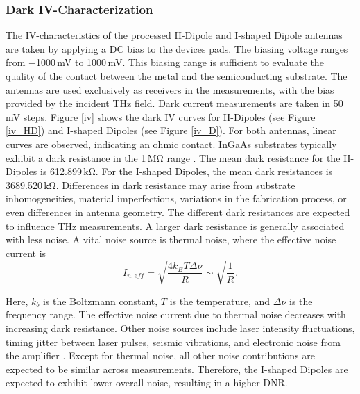 \subsubsection{Dark IV-Characterization}

The IV-characteristics of the processed H-Dipole and I-shaped Dipole antennas are taken by applying a DC bias to the devices pads. The biasing voltage ranges from \num{-1000}\,\si{\milli \volt} to \num{1000}\,\si{\milli \volt}. This biasing range is sufficient to evaluate the quality of the contact between the metal and the semiconducting substrate. The antennas are used exclusively as receivers in the measurements, with the bias provided by the incident THz field. Dark current measurements are taken in \num{50}\,\si{\milli \volt} steps. Figure \ref{iv} shows the dark IV curves for H-Dipoles (see Figure \ref{iv_HD}) and I-shaped Dipoles (see Figure \ref{iv_D}). For both antennas, linear curves are observed, indicating an ohmic contact. InGaAs substrates typically exhibit a dark resistance in the \num{1}\,\si{\mega \ohm} range \cite{seddonContinuousWaveTerahertz2024}. The mean dark resistance for the H-Dipoles is \num{612.899}\,\si{\kilo \ohm}. For the I-shaped Dipoles, the mean dark resistances is \num{3689.520}\,\si{\kilo \ohm}. Differences in dark resistance may arise from substrate inhomogeneities, material imperfections, variations in the fabrication process, or even differences in antenna geometry. The different dark resistances are expected to influence THz measurements. A larger dark resistance is generally associated with less noise. A vital noise source is thermal noise, where the effective noise current is 
\begin{equation}
    I_{n, eff} = \sqrt{\frac{4k_B T \Delta \nu}{R}} \sim \sqrt{\frac{1}{R}}.
\end{equation}

Here, $k_b$ is the Boltzmann constant, $T$ is the temperature, and $\Delta \nu$ is the frequency range. The effective noise current due to thermal noise decreases with increasing dark resistance. Other noise sources include laser intensity fluctuations, timing jitter between laser pulses, seismic vibrations, and electronic noise from the amplifier \cite{dongNoiseCharacteristicsTerahertz2015,vanexterCharacterizationOptoelectronicTerahertz1990}. Except for thermal noise, all other noise contributions are expected to be similar across measurements. Therefore, the I-shaped Dipoles are expected to exhibit lower overall noise, resulting in a higher DNR.

